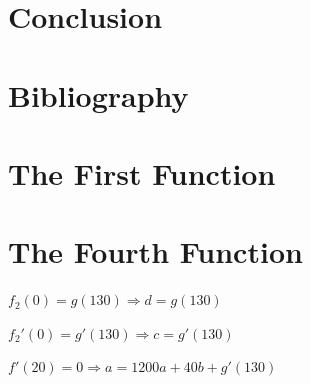 \documentclass[11pt, letterpaper]{article}
\begin{document}
\section{Conclusion}


\section {Bibliography}
\begin{appendices}
	\section{The First Function}
	
	
	\section{The Fourth Function}
	$f_2(0)=g(130)\Rightarrow d=g(130)$
	
	$f_2'(0) = g'(130)\Rightarrow c=g'(130)$
	
	$f'(20)=0\Rightarrow a=1200a+40b+g'(130)$
	
	
\end{appendices}
\end{document}
